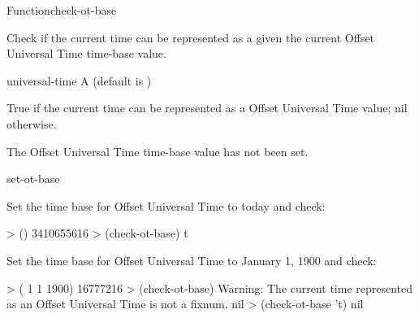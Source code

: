 \documentclass[10pt,twoside,english,pdftex]{article}
\begin{document}

\begin{functiondoc}{Function}{check-ot-base}{
    \returns{} }

%

\fnsyntax

\fnpurpose Check if the current time can be represented as a 
given the current Offset Universal Time time-base value.

\fnpackage {}

\fnmodule {}

\fnargs
\begin{args}{universal-time}
 A  (default is \nil)
\end{args}

\fnreturns True if the current time can be represented as a 
Offset Universal Time value; nil otherwise.

\fnerrors The Offset Universal Time time-base value has not been set.

\begin{alsos}{set-ot-base}
\also[*ot-base*]
\also[ot2ut]
\also[ut2ot]
\end{alsos}

\fnexamples
Set the time base for Offset Universal Time to today and check:
%
\W\supp
\begin{example}
> ()
3410655616
> (check-ot-base)
t
\end{example}
%
Set the time base for Offset Universal Time to January 1, 1900 and check:
%
\W\supp\notpretop
\begin{example}
> ( 1 1 1900)
16777216
> (check-ot-base)
Warning: The current time represented as an Offset Universal Time is not a fixnum.
nil
> (check-ot-base 't)
nil
\end{example}

\end{functiondoc}

\end{document}
